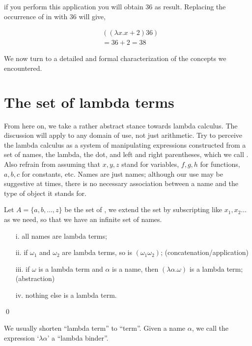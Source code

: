 \documentclass[11pt]{article}
\begin{document}
if you perform this application you will obtain 36 as result. Replacing the occurrence of  in  with 36 will give,

\begin{align}
& ((\lambda x. x+2)36)\\
& = 36+2 = 38 \nonumber
\end{align}


We now turn to a detailed and formal characterization of the concepts we encountered.


\section{The set of lambda terms}

From here on, we take a rather abstract stance towards lambda calculus.  The discussion will apply to any domain of use, not just arithmetic. Try to perceive the lambda calculus as a system of manipulating expressions constructed from a set of names, the lambda, the dot, and left and right parentheses, which we call . Also refrain from assuming that $x, y, z$ stand for variables, $f, g, h$ for functions, $a, b, c$  for constants, etc. Names are just names; although our use may be suggestive at times, there is no necessary association between a name and the type of object it stands for.

\begin{udefinition}\label{dfexp}
Let $A=\{ a,b,\ldots,z\}$ be the set of , we extend the set by subscripting like $x_1,x_2\ldots$ as we need, so that we have an infinite set of names.

\begin{itemize}
\item[i.] all names are lambda terms;
\item[ii.] if $\omega_1$ and $\omega_2$ are lambda terms, so is $(\omega_1\omega_2)$; \hfill (concatenation/application)
\item[iii.] if $\omega$ is a lambda term and $\alpha$ is a name, then
$(\lambda\alpha.\omega)$ is a lambda term; \hfill (abstraction)
\item[iv.] nothing else is a lambda term.
\end{itemize}
\qed
\end{udefinition}

We usually shorten ``lambda term'' to ``term''. Given a name $\alpha$, we call the expression `$\lambda\alpha$' a ``lambda binder''.
\end{document}
